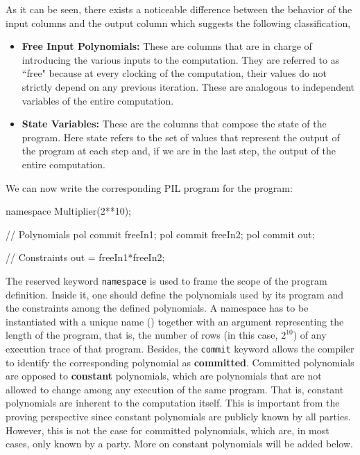 As it can be seen, there exists a noticeable difference between the behavior of the input columns and the output column which suggests the following classification,
\begin{itemize}
\item \textbf{Free Input Polynomials:} These are columns that are in charge of introducing the various inputs to the computation. They are referred to as ``free" because at every clocking of the computation, their values do not strictly depend on any previous iteration. These are analogous to independent variables of the entire computation.

\item \textbf{State Variables:} These are the columns that compose the state of the program. Here state refers to the set of values that represent the output of the program at each step and, if we are in the last step, the output of the entire computation.
\end{itemize}




We can now write the corresponding PIL program for the \Multiplier program:
\begin{pil}
namespace Multiplier(2**10);

    // Polynomials
    pol commit freeIn1;
    pol commit freeIn2;
    pol commit out;

    // Constraints
    out = freeIn1*freeIn2;
\end{pil}

The reserved keyword \texttt{namespace} is used to frame the scope of the program definition. Inside it, one should define the polynomials used by its program and the constraints among the defined polynomials. A namespace has to be instantiated with a unique name (\Multiplier) together with an argument representing the length of the program, that is, the number of rows (in this case, $2^{10}$) of any execution trace of that program. Besides, the \texttt{commit} keyword allows the compiler to identify the corresponding polynomial as \textbf{committed}. Committed polynomials are opposed to \textbf{constant} polynomials, which are polynomials that are not allowed to change among any execution of the same program. That is, constant polynomials are inherent to the computation itself. This is important from the proving perspective since constant polynomials are publicly known by all parties. However, this is not the case for committed polynomials, which are, in most cases, only known by a party. More on constant polynomials will be added below. 

